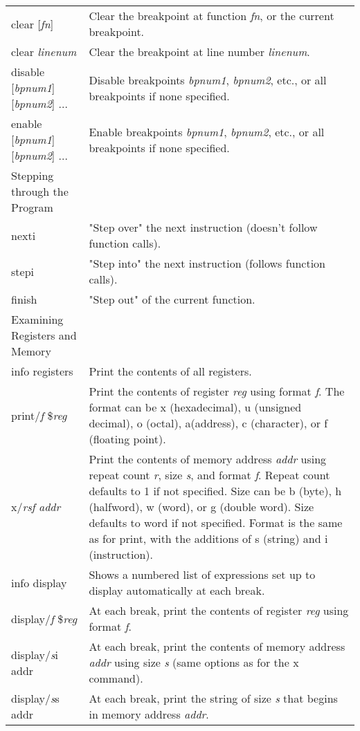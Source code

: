 \begin{table}[h]
\begin{tabular}{l | l}
clear [\emph{fn}] & Clear the breakpoint at function \emph{fn}, or the current breakpoint. \\
clear \emph{linenum} & Clear the breakpoint at line number \emph{linenum}. \\
disable\index{disable} [\emph{bpnum1}] [\emph{bpnum2}] ... & Disable breakpoints \emph{bpnum1}, \emph{bpnum2}, etc., or all breakpoints if none specified. \\
enable\index{enable} [\emph{bpnum1}] [\emph{bpnum2}] ... & Enable breakpoints \emph{bpnum1}, \emph{bpnum2}, etc., or all breakpoints if none specified. \\
Stepping through the Program \\
nexti\index{nexti} & "Step over" the next instruction (doesn't follow function calls). \\
stepi\index{stepi} & "Step into" the next instruction (follows function calls). \\
finish\index{finish} & "Step out" of the current function. \\
Examining Registers and Memory \\
info registers\index{info registers} & Print the contents of all registers. \\
print\index{print}/\emph{f} \$\emph{reg} & Print the contents of register \emph{reg} using format \emph{f}.  The format can be x (hexadecimal), u (unsigned decimal), o (octal), a(address), c (character), or f (floating point). \\
x\index{x}/\emph{rsf} \emph{addr} & Print the contents of memory address \emph{addr} using repeat count \emph{r}, size \emph{s}, and format \emph{f}.  Repeat count defaults to 1 if not specified.  Size can be b (byte), h (halfword), w (word), or g (double word).  Size defaults to word if not specified.  Format is the same as for print, with the additions of s (string) and i (instruction). \\
info display\index{info display} & Shows a numbered list of expressions set up to display automatically at each break. \\
display\index{display}/\emph{f} \$\emph{reg} & At each break, print the contents of register \emph{reg} using format \emph{f}. \\
display/\emph{s}i addr & At each break, print the contents of memory address \emph{addr} using size \emph{s} (same options as for the x command). \\
display/\emph{s}s addr & At each break, print the string of size \emph{s} that begins in memory address \emph{addr}. \\

\end{tabular}
\end{table}

